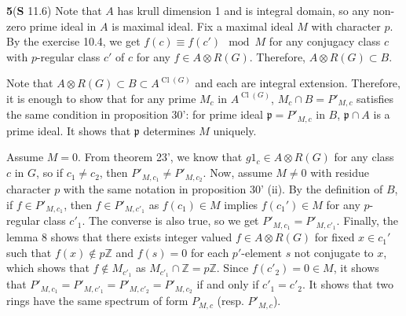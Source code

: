 \documentclass[a4paper, 12pt]{article}
\theoremstyle{Mydefinition}
\theoremstyle{Mytheorem}
\DeclareMathOperator{\cl}{Cl}
\begin{document}
\noindent \textbf{5}(\textbf{S} 11.6)
Note that $A$ has krull dimension 1 and is integral domain, so any non-zero prime ideal in $A$ is maximal ideal. Fix a maximal ideal $M$ with character $p$. By the exercise 10.4, we get $f(c)\equiv f(c')\mod M$ for any conjugacy class $c$ with $p$-regular class $c'$ of $c$ for any $f\in A\otimes R(G)$. Therefore, $A\otimes R(G)\subset B$.

Note that $A\otimes R(G)\subset B\subset A^{\cl(G)}$ and each are integral extension. Therefore, it is enough to show that for any prime $M_c$ in $A^{\cl(G)}$, $M_c\cap B = P'_{M, c}$ satisfies the same condition in proposition 30': for prime ideal $\mathfrak{p} = P'_{M,c}$ in $B$, $\mathfrak{p}\cap A$ is a prime ideal. It shows that $\mathfrak{p}$ determines $M$ uniquely.

Assume $M=0$. From theorem 23', we know that $g1_c\in A\otimes R(G)$ for any class $c$ in $G$, so if $c_1\neq c_2$, then $P'_{M, c_1}\neq P'_{M, c_2}$. Now, assume $M\neq 0$ with residue character $p$ with the same notation in proposition 30' (ii). By the definition of $B$, if $f\in P'_{M,c_1}$, then $f\in P'_{M,c'_1}$ as $f(c_1)\in M$ implies $f(c_1')\in M$ for any $p$-regular class $c'_1$. The converse is also true, so we get $P'_{M,c_1} = P'_{M, c'_1}$. Finally, the lemma 8 shows that there exists integer valued $f\in A\otimes R(G)$ for fixed $x\in c_1'$ such that $f(x)\not\in p\mathbb{Z}$ and $f(s)=0$ for each $p'$-element $s$ not conjugate to $x$, which shows that $f\not\in M_{c'_1}$ as $M_{c'_1}\cap \mathbb{Z} = p\mathbb{Z}$. Since $f(c'_2) = 0\in M$, it shows that $P'_{M, c_1} = P'_{M, c'_1} = P'_{M, c'_2} = P'_{M, c_2}$ if and only if $c'_1=c'_2$. It shows that two rings have the same spectrum of form $P_{M, c}$ (resp. $P'_{M, c}$).
\end{document}
